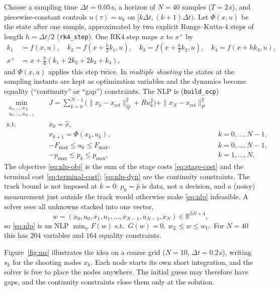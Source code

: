 \documentclass[11pt]{article}
\newcommand{\R}{\mathbb{R}}
\newcommand{\xref}{x_{\mathrm{ref}}}
\begin{document}
Choose a sampling time $\Delta t=0.05$\,s, a horizon of $N=40$ samples ($T=2$\,s),
and piecewise-constant controls $u(\tau)=u_k$ on $[k\Delta t,(k+1)\Delta t)$.
Let $\Phi(x,u)$ be the state after one sample, approximated by two explicit
Runge--Kutta-4 steps of length $h=\Delta t/2$ (\texttt{rk4\_step}). One RK4 step
maps $x$ to $x^+$ by
\begin{subequations}\label{eq:rk4}
\begin{align}
  k_1 &= f(x,u),\quad k_2 = f(x+\tfrac h2 k_1,u),\quad k_3 = f(x+\tfrac h2 k_2,u),\quad k_4=f(x+hk_3,u), \label{eq:rk4-stages}\\
  x^+ &= x + \tfrac h6 (k_1+2k_2+2k_3+k_4), \label{eq:rk4-update}
\end{align}
\end{subequations}
and $\Phi(x,u)$ applies this step twice.
In \emph{multiple shooting} the states at the sampling instants are kept as
optimization variables and the dynamics become equality (``continuity'' or ``gap'')
constraints. The NLP is (\texttt{build\_ocp})
\begin{subequations}\label{eq:nlp}
\begin{align}
  \min_{\substack{x_0,\dots,x_N\\ u_0,\dots,u_{N-1}}}\quad & J = \sum_{k=0}^{N-1} \Big(\|x_k-\xref\|_Q^2 + R u_k^2\Big) + \|x_N-\xref\|_P^2 \label{eq:nlp-obj}\\
  \text{s.t.}\quad & x_0 = \hat x, \label{eq:nlp-init}\\
  & x_{k+1} = \Phi(x_k,u_k), && k=0,\dots,N-1, \label{eq:nlp-dyn}\\
  & {-F_{\max}}\le u_k \le F_{\max}, && k=0,\dots,N-1, \label{eq:nlp-u}\\
  & {-p_{\max}}\le p_k \le p_{\max}, && k=1,\dots,N. \label{eq:nlp-p}
\end{align}
\end{subequations}
The objective \eqref{eq:nlp-obj} is the sum of the stage costs \eqref{eq:stage-cost} and
the terminal cost \eqref{eq:terminal-cost}; \eqref{eq:nlp-dyn} are the continuity
constraints.
The track bound is not imposed at $k=0$: $p_0=\hat p$ is data, not a decision, and
a (noisy) measurement just outside the track would otherwise make \eqref{eq:nlp}
infeasible.
A solver sees all unknowns stacked into one vector,
\[
  w = (x_0,u_0,x_1,u_1,\dots,x_{N-1},u_{N-1},x_N)\in\R^{5N+4},
\]
so \eqref{eq:nlp} is an NLP $\min_w F(w)$ s.t.\ $G(w)=0$, $w_L\le w\le w_U$.
For $N=40$ this has $204$ variables and $164$ equality constraints.

Figure~\ref{fig:ms} illustrates the idea on a coarse grid ($N=10$, $\Delta t=0.2$\,s),
writing $s_k$ for the shooting nodes $x_k$. Each node starts its own short integration,
and the solver is free to place the nodes anywhere. The initial guess may therefore have
gaps, and the continuity constraints close them only at the solution.
\end{document}
